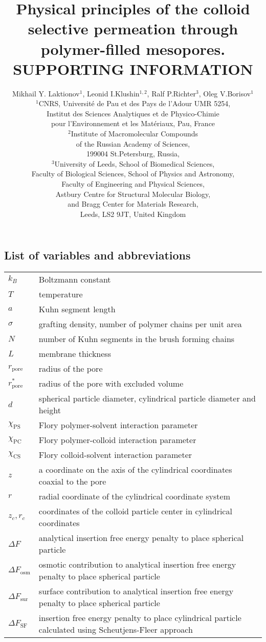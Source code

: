 \documentclass[10pt, a4paper]{article}
\title{Physical principles of the colloid selective permeation through polymer-filled mesopores.\\
        SUPPORTING INFORMATION}
\author{Mikhail Y. Laktionov$^1$, Leonid I.Klushin$^{1,2}$, Ralf P.Richter$^3$, Oleg V.Borisov$^1$\\
$^{1}$CNRS, Universit\'e de Pau et des Pays de l'Adour UMR 5254,\\
Institut des Sciences Analytiques et de Physico-Chimie\\
pour l'Environnement et les Mat\'eriaux, Pau, France \\
$^{2}$Institute of Macromolecular Compounds \\
of the Russian Academy of Sciences, \\
199004 St.Petersburg, Russia,\\
$^{3}$University of Leeds, School of Biomedical Sciences, \\
Faculty of Biological Sciences, 
School of Physics and Astronomy, \\
Faculty of Engineering and Physical Sciences,\\  
Astbury Centre for Structural Molecular Biology,\\ 
and Bragg Center for Materials Research,\\ 
Leeds, LS2 9JT, United Kingdom}
\begin{document}
\maketitle

\subsection*{List of variables and abbreviations}

\begin{tabularx}{\linewidth}{l l}
$k_B$ & Boltzmann constant \\
$T$ & temperature \\
$a$ & Kuhn segment length \\
$\sigma$ & grafting density, number of polymer chains per unit area \\
$N$ & number of Kuhn segments in the brush forming chains \\
$L$ & membrane thickness \\
$r_{\textrm{pore}}$ & radius of the pore \\
$r^{\ast}_{\textrm{pore}}$ & radius of the pore with excluded volume \\
$d$ & spherical particle diameter, cylindrical particle diameter and height \\ 
$\chi_{\textrm{PS}}$ & Flory polymer-solvent interaction parameter  \\
$\chi_{\textrm{PC}}$ & Flory polymer-colloid interaction parameter  \\
$\chi_{\textrm{CS}}$ & Flory colloid-solvent interaction parameter  \\
$z$ & a coordinate on the axis of the cylindrical coordinates coaxial to the pore \\
$r$ & radial coordinate of the cylindrical coordinate system \\
$z_{c}, r_{c}$ & coordinates of the colloid particle center in cylindrical coordinates \\
$\Delta F$ & analytical insertion free energy penalty to place spherical particle \\
$\Delta F_{\textrm{osm}}$ & osmotic contribution to analytical insertion free energy penalty to place spherical particle \\
$\Delta F_{\textrm{sur}}$ & surface contribution to analytical insertion free energy penalty to place spherical particle \\
$\Delta F_{\textrm{SF}}$ & insertion free energy penalty to place cylindrical particle calculated using Scheutjens-Fleer approach \\

\end{tabularx}
\end{document}
